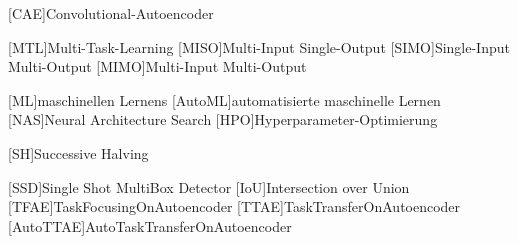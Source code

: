 \begin{acronym}[IEEE]
	
	[CAE]{Convolutional-Autoencoder}	
	
	[MTL]{Multi-Task-Learning}		
	[MISO]{Multi-Input Single-Output}	
	[SIMO]{Single-Input Multi-Output}	
	[MIMO]{Multi-Input Multi-Output}	
	
	[ML]{maschinellen Lernens}
	[AutoML]{automatisierte maschinelle Lernen}
	[NAS]{Neural Architecture Search}
	[HPO]{Hyperparameter-Optimierung}
	
	[SH]{Successive Halving}	
	
	
	[SSD]{Single Shot MultiBox Detector}
	[IoU]{Intersection over Union}
	[TFAE]{TaskFocusingOnAutoencoder}
	[TTAE]{TaskTransferOnAutoencoder}
	[AutoTTAE]{AutoTaskTransferOnAutoencoder}
			
\end{acronym}
